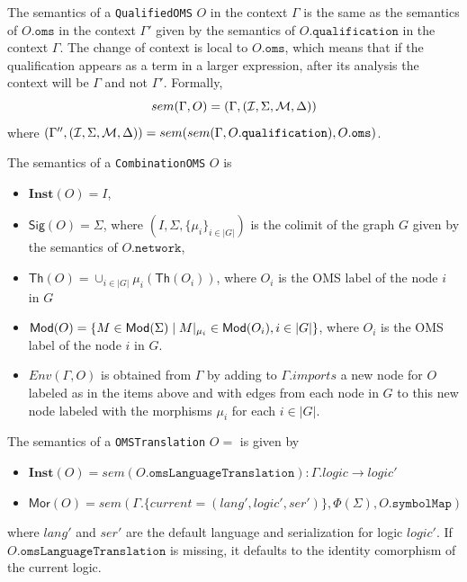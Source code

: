 \documentclass[10pt,fleqn,final]{scrreprt}
\newcommand*{\syntax}[1]{\texttt{#1}}
\newcommand{\Sig}{\mathsf{Sig}}
\renewcommand{\Th}{\mathsf{Th}}
\newcommand{\Mor}{\mathsf{Mor}}
\newcommand{\Inst}{\ensuremath{\mathbf{Inst}}}
\newcommand{\semdom}[1]{
\begin{center}
\fbox{$#1$}
\end{center}
}
\newcommand{\current}{\mathit{current}}
\newenvironment{definitions}[0]{\medskip }{}
\begin{document}
\begin{definitions}
 
The semantics of a \syntax{QualifiedOMS} $O$ 
in the context $\Gamma$ is the same as the
semantics of $O.\syntax{oms}$ in the context
$\Gamma'$ given by the semantics of
$O.\syntax{qualification}$ in the context $\Gamma$.
The change of context is local to $O.\syntax{oms}$, which
means that if the qualification appears as a term in 
a larger expression, after its analysis the context will
be $\Gamma$ and not $\Gamma'$.
Formally,
$$sem(\Gamma, O) = (\Gamma, ({\cal I},\Sigma, {\cal M}, \Delta))$$
\noindent where $(\Gamma'',(\cI,\Sigma,\cM,\Delta)) = 
sem(sem(\Gamma, O.\syntax{qualification}), 
    O.\syntax{oms})$.


The semantics of a \syntax{CombinationOMS} $O$ is
\begin{itemize}
  \item $\Inst(O) = I$,
  \item $\Sig(O) = \Sigma$, where $(I,\Sigma,  \{\mu_i\}_{i\in |G|})$ is the colimit of the graph $G$ given by the semantics of $O.\syntax{network}$,
  \item $\Th(O) = \cup_{i\in |G|} \mu_i(\Th(O_i))$, where $O_i$ is the OMS label of the node $i$ in $G$
  \item $\mathsf{Mod}(O) =  \{ M\in\mathsf{Mod}(\Sigma) \mid M|_{\mu_i} \in \mathsf{Mod}(O_i), i\in |G| \}$, where $O_i$ is the OMS label of the node $i$ in $G$.
  \item $Env(\Gamma,O)$ is obtained from $\Gamma$ by adding to $\Gamma.imports$ 
  a new node for $O$ labeled as in the items above and with edges from each node in
  $G$ to this new node labeled with the morphisms $\mu_i$ for each $i\in |G|$.
\end{itemize}


\semdom{sem(\Gamma,\Sigma, \syntax{OMSTranslation})=((\Phi,\alpha,\beta),  \sigma)}
The semantics of a \syntax{OMSTranslation}
$O=$
is given by
\begin{itemize}
 \item $\Inst(O) = sem(O.\syntax{omsLanguageTranslation}) : \Gamma.logic \to logic'$
 \item $\Mor(O) = sem(\Gamma.\{\current=(lang', logic', ser')\}, \Phi(\Sigma), O.\syntax{symbolMap})$
\end{itemize}
\noindent where
$lang'$ and $ser'$ are the default language and serialization for logic $logic'$.
If $O.\syntax{omsLanguageTranslation}$ is missing, 
it defaults to the identity comorphism of the current logic.


\end{definitions}
\end{document}
